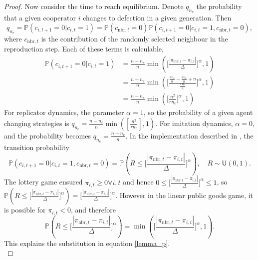 \begin{proof}
Now consider the time to reach equilibrium. Denote $q_{n_c}$ the probability that a given cooperator $i$ changes to defection in a given generation. Then  $$q_{n_c} = \mathbb P(c_{i,t+1} = 0 | c_{i,t} = 1) = \mathbb P(c_{\text{nbr},t} = 0)\mathbb P (c_{i,t+1} = 0 | c_{i,t} =1, c_{\text{nbr}, t}=0), $$ where $c_{\text{nbr},t}$ is the contribution of the randomly selected neighbour in the reproduction step. Each of these terms is calculable, \\
\begin{align}  \label{lemma_p}
    \mathbb P(c_{i,t+1} = 0 | c_{i,t} = 1) &= \frac{n-n_c}{n} \min\left( \Big[\frac{|\pi_{\text{nbr},t} - \pi_{i,t}|}{\Delta} \Big]^\alpha, 1\right)\\
    &= \frac{n-n_c}{n} \min\left(\Big[ \frac{\tfrac{rn_c}{n} - \tfrac{rn_c}{n} +n}{\tfrac{rn_c}{n}} \Big]^\alpha, 1\right) \nonumber\\
    &= \frac{n-n_c}{n}\min\left(\Big[ \frac{n^2}{rn_c} \Big]^\alpha,1\right) \nonumber
\end{align}
For replicator dynamics, the parameter $\alpha = 1$, so the probability of a given agent changing strategies is $ q_{n_c} = \frac{n-n_c}{n}\min([ \frac{n^2}{rn_c} ],1)$. For imitation dynamics, $\alpha = 0$, and the probability becomes $q_{n_c} = \frac{n-n_c}{n}$. In the implementation described in \cite{RN30}, the transition probability $$\mathbb P (c_{i,t+1} = 0 | c_{i,t} =1, c_{\text{nbr}, t}=0) = \mathbb P (R \leq \Bigg[\frac{|\pi_{\text{nbr},t} - \pi_{i,t}|}{\Delta} \Bigg]^\alpha), \quad R  \sim \mathsf{U}(0,1).$$ The lottery game ensured $\pi_{i,t}\geq 0 \forall i,t$ and hence $ 0 \leq \Big[\frac{|\pi_{\text{nbr},t} - \pi_{i,t}|}{\Delta} \Big]^\alpha \leq 1$, so $\mathbb P (R \leq \Big[\frac{|\pi_{\text{nbr},t} - \pi_{i,t}|}{\Delta} \Big]^\alpha) = \Big[\frac{|\pi_{\text{nbr},t} - \pi_{i,t}|}{\Delta} \Big]^\alpha$. However in the linear public goods game, it is possible for $\pi_{i,t}< 0$, and therefore $$\mathbb P (R \leq \Big[\frac{|\pi_{\text{nbr},t} - \pi_{i,t}|}{\Delta} \Big]^\alpha) = \min(\Big[\frac{|\pi_{\text{nbr},t} - \pi_{i,t}|}{\Delta} \Big]^\alpha, 1). $$ This explains the substitution in equation \eqref{lemma_p}.   \\


\end{proof}

